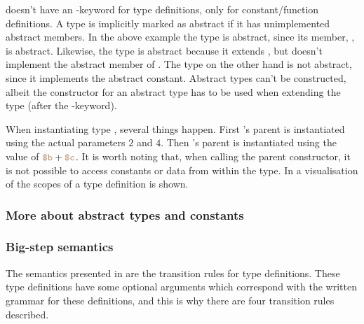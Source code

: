 
\productname{} doesn't have an -keyword for type definitions, only
for constant/function definitions. A type is implicitly marked as abstract if it has
unimplemented abstract members. In the above example the type  is abstract,
since its member, , is abstract. Likewise, the type
 is abstract because it extends , but doesn't implement the abstract
member of . The type  on the other hand is not abstract, since it
implements the abstract constant. Abstract types can't be constructed, albeit the
constructor for an abstract type has to be used when extending the type (after the
-keyword).

When instantiating type , several things happen. First 's parent
is instantiated using the actual parameters $2$ and $4$. Then 's parent
is instantiated using the value of $\variable{b} + \variable{c}$. It is worth
noting that, when calling the parent constructor, it is not possible to access
constants or data from within the type. In  a
visualisation of the scopes of a type definition is shown.




\subsubsection{More about abstract types and constants}

\subsubsection{Big-step semantics}

The semantics presented in  are the transition rules for type definitions.
These type definitions have some optional arguments which correspond with the
written grammar for these definitions, and this is why there are four transition
rules described.

